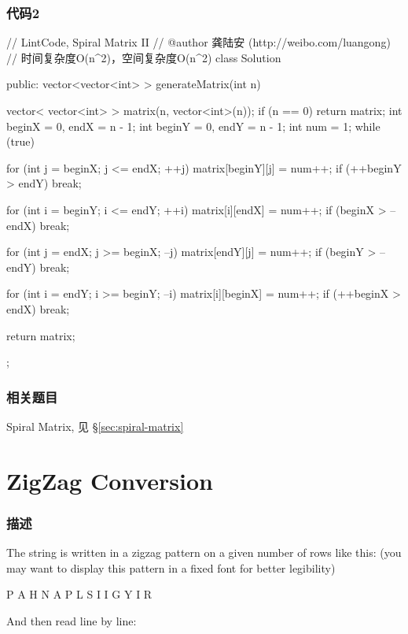 \subsubsection{代码2}
\begin{Code}
// LintCode, Spiral Matrix II
// @author 龚陆安 (http://weibo.com/luangong)
// 时间复杂度O(n^2)，空间复杂度O(n^2)
class Solution {
public:
    vector<vector<int> > generateMatrix(int n) {
        vector< vector<int> > matrix(n, vector<int>(n));
        if (n == 0) return matrix;
        int beginX = 0, endX = n - 1;
        int beginY = 0, endY = n - 1;
        int num = 1;
        while (true) {
            for (int j = beginX; j <= endX; ++j) matrix[beginY][j] = num++;
            if (++beginY > endY) break;

            for (int i = beginY; i <= endY; ++i) matrix[i][endX] = num++;
            if (beginX > --endX) break;

            for (int j = endX; j >= beginX; --j) matrix[endY][j] = num++;
            if (beginY > --endY) break;

            for (int i = endY; i >= beginY; --i) matrix[i][beginX] = num++;
            if (++beginX > endX) break;
        }
        return matrix;
    }
};
\end{Code}


\subsubsection{相关题目}
\begindot
\item Spiral Matrix, 见 \S \ref{sec:spiral-matrix}
\myenddot


\section{ZigZag Conversion} %
\label{sec:zigzag-conversion}


\subsubsection{描述}
The string  is written in a zigzag pattern on a given number of rows like this: (you may want to display this pattern in a fixed font for better legibility)

\begin{Code}
P   A   H   N
A P L S I I G
Y   I   R
\end{Code}

And then read line by line: 


